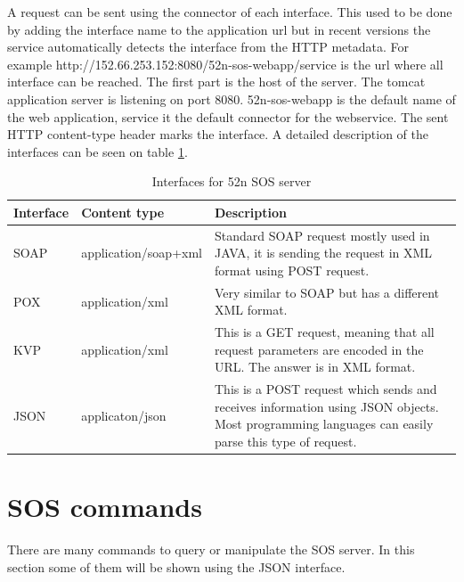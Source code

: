 A request can be sent using the connector of each interface. This used to be done by adding the interface name to the application url but in recent versions the service automatically detects the interface from the HTTP metadata. For example http://152.66.253.152:8080/52n-sos-webapp/service is the url where all interface can be reached. The first part is the host of the server. The tomcat application server is listening on port 8080. 52n-sos-webapp is the default name of the web application, service it the default connector for the webservice. The sent HTTP content-type header marks the interface. A detailed description of the interfaces can be seen on table \ref{tab:services}.
\begin{table}[h]
\begin{center}
\begin{tabular}{| l | l | p{8cm} |}
\hline
Interface  & Content type & Description \\ \hline \hline
SOAP & application/soap+xml & Standard SOAP request mostly used in JAVA, it is sending the request in XML format using POST request. \\ \hline
POX & application/xml & Very similar to SOAP but has a different XML format. \\ \hline
KVP & application/xml & This is a GET request, meaning that all request parameters are encoded in the URL. The answer is in XML format. \\ \hline
JSON & applicaton/json & This is a POST request which sends and receives information using JSON objects. Most programming languages can easily parse this type of request.\\ \hline
\end{tabular}
\caption{Interfaces for 52n SOS server\label{tab:services}}
\end{center}
\end{table}


\section{SOS commands}
There are many commands to query or manipulate the SOS server. In this section some of them will be shown using the JSON interface. 

